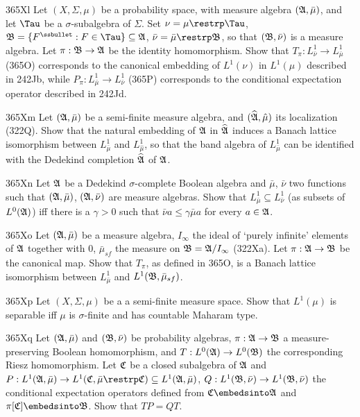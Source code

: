 {\sqheader 365Xl Let $(X,\Sigma,\mu)$ be a probability space, with
measure algebra $(\frak A,\bar\mu)$, and let $\Tau$ be a
$\sigma$-subalgebra of $\Sigma$.   Set $\nu=\mu\restrp\Tau$, $\frak
B=\{F^{\ssbullet}:F\in\Tau\}\subseteq\frak A$,
$\bar\nu=\bar\mu\restrp\frak B$, so that
$(\frak B,\bar\nu)$ is a measure algebra.   Let $\pi:\frak B\to\frak A$
be the identity homomorphism.    Show that
$T_{\pi}:L^1_{\bar\nu}\to L^1_{\bar\mu}$ (365O) corresponds to the
canonical
embedding of $L^1(\nu)$ in $L^1(\mu)$ described in 242Jb, while
$P_{\pi}:L^1_{\bar\mu}\to L^1_{\bar\nu}$ (365P)
corresponds to the conditional expectation operator described in
242Jd.
     
\spheader 365Xm Let $(\frak A,\bar\mu)$ be a semi-finite measure
algebra, and $(\widehat{\frak A},\hat\mu)$ its localization (322Q).
Show that the natural embedding of $\frak A$ in $\widehat{\frak A}$
induces a Banach lattice isomorphism between $L^1_{\bar\mu}$ and
$L^1_{\hat\mu}$, so that the band algebra of
$L^1_{\bar\mu}$ can be identified with the Dedekind completion
$\widehat{\frak A}$ of $\frak A$.
     
\spheader 365Xn Let $\frak A$ be a Dedekind $\sigma$-complete Boolean
algebra and $\bar\mu$, $\bar\nu$ two functions such that $(\frak
A,\bar\mu)$, $(\frak A,\bar\nu)$ are measure algebras.   Show that
$L^1_{\bar\mu}\subseteq L^1_{\bar\nu}$ (as subsets of $L^0(\frak A)$)
iff there is a $\gamma>0$ such that $\bar\nu a\le\gamma\bar\mu a$ for
every $a\in\frak A$.   
     
\spheader 365Xo Let $(\frak A,\bar\mu)$ be a measure algebra,
$I_{\infty}$ the ideal of `purely infinite' elements of $\frak A$
together with $0$,
$\bar\mu_{sf}$ the measure on $\frak B=\frak A/I_{\infty}$ (322Xa).
Let $\pi:\frak A\to\frak B$ be the canonical map.   Show that $T_{\pi}$,
as defined in 365O, is a Banach lattice isomorphism between
$L^1_{\bar\mu}$ and $L^1(\frak B,\bar\mu_{sf})$.
     
\spheader 365Xp Let $(X,\Sigma,\mu)$ be a a semi-finite measure space.
Show that $L^1(\mu)$ is separable iff $\mu$ is $\sigma$-finite and has
countable Maharam type.

\spheader 365Xq Let $(\frak A,\bar\mu)$ and $(\frak B,\bar\nu)$ be
probability algebras, $\pi:\frak A\to\frak B$ a measure-preserving Boolean
homomorphism, and $T:L^0(\frak A)\to L^0(\frak B)$ the corresponding Riesz
homomorphism.   Let $\frak C$ be a closed subalgebra of $\frak A$ and
$P:L^1(\frak A,\bar\mu)\to L^1(\frak C,\bar\mu\restrp\frak C)
\subseteq L^1(\frak A,\bar\mu)$, 
$Q:L^1(\frak B,\bar\nu)\to L^1(\frak B,\bar\nu)$ the conditional
expectation operators defined from $\frak C\embedsinto\frak A$
and $\pi[\frak C]\embedsinto\frak B$.   Show that $TP=QT$.
     
}
